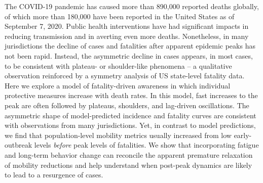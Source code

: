 The COVID-19 pandemic has caused more than 890,000 reported deaths globally, of which more than 180,000 have been reported in the United States as of September 7, 2020. 
Public health interventions have had significant impacts in reducing transmission and in averting even more deaths. 
Nonetheless, in many jurisdictions the decline of cases and fatalities after apparent epidemic peaks has not been rapid.  
Instead, the asymmetric decline in cases appears, in most cases, to be consistent with plateau- or shoulder-like phenomena -- a qualitative observation reinforced by a symmetry analysis of US state-level fatality data.  
Here we explore a model of fatality-driven awareness in which individual protective measures increase with death rates.  
In this model, fast increases to the peak are often followed by plateaus, shoulders, and lag-driven oscillations. 
The asymmetric shape of model-predicted incidence and fatality curves are consistent with observations from many jurisdictions. 
Yet, in contrast to model predictions, we find that population-level mobility metrics usually increased from low early-outbreak levels \emph{before} peak levels of fatalities.  
We show that incorporating fatigue and long-term behavior change can reconcile the apparent premature relaxation of mobility reductions and help understand when post-peak dynamics are likely to lead to a resurgence of cases.
